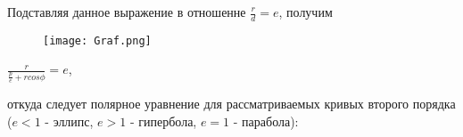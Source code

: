 \documentclass[10pt]{article}
\begin{document}
Подставляя данное выражение в отношенне $\frac{r}{d}=e$, получим

\newpage


\begin{center}
\begin{figure}
    \centering
    \texttt{[image: Graf.png]}    
\end{figure}
$\frac{r}{\frac{p}{e} + rcos\phi} = e$,
\end{center}

откуда следует полярное уравнение для рассматриваемых кривых второго порядка ($e<1$ - эллипс, $e>1$ - гипербола, $e=1$ - парабола):
\end{document}
